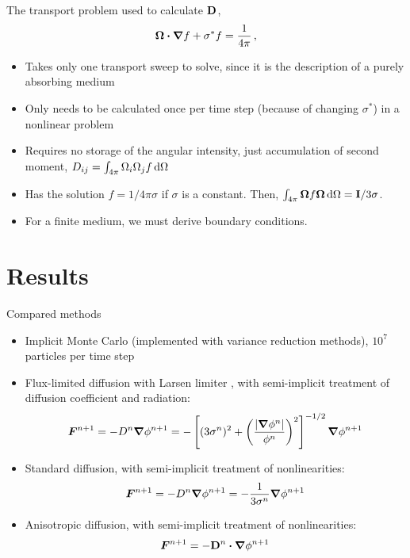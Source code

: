 \documentclass{beamer}
\begin{document}
\begin{frame}
  The transport problem used to calculate $\mathbf{D}$,
  \begin{equation*}
    \bm{\Omega}\bm{\cdot} \bm{\nabla} f + \sigma^* f = \frac{1}{4\pi} \,,
  \end{equation*}
  \vspace{-\baselineskip}
  \begin{itemize}
    \item Takes only one transport sweep to solve, since it is the description
      of a purely absorbing medium
    \item Only needs to be calculated once per time step (because of changing
      $\sigma^*$) in a nonlinear problem \item Requires no storage of the
      angular intensity, just accumulation of second moment, $D_{ij} =
      \int_{4\pi} \Omega_i \Omega_j f \mathop{}\!\mathrm{d} \Omega$
    \item Has the solution $f=1/4\pi\sigma$ if $\sigma$ is a constant.
      Then, $\int_{4\pi} \bm{\Omega} f \bm{\Omega} \mathop{}\!\mathrm{d} \Omega =
      \mathbf{I}/3\sigma$.
    \item For a finite medium, we must derive boundary conditions.
  \end{itemize}
\end{frame}

\section{Results}
\begin{frame}{Compared methods}
\begin{itemize}
  \item Implicit Monte Carlo \cite{Fle1971} (implemented with variance
    reduction methods), $10^7$ particles per time step
  \item Flux-limited diffusion with Larsen limiter \cite{Ols2000}, with
    semi-implicit treatment of diffusion coefficient and radiation:
    \begin{equation*}
      \bm{F}^{n+1} = - D^{n} \bm{\nabla} \phi^{n+1}  = -\left[ (3\sigma^{n})^2
      + \left( \frac{\left| \bm{\nabla} \phi^{n} \right|}{\phi^{n}}  \right)^2 \right]^{-1/2}
      \bm{\nabla} \phi^{n+1}
    \end{equation*}
  \item Standard diffusion, with semi-implicit treatment of nonlinearities:
    \begin{equation*}
      \bm{F}^{n+1} = - D^{n} \bm{\nabla} \phi^{n+1} 
      = -\frac{1}{3\sigma^{n}} \bm{\nabla} \phi^{n+1}
    \end{equation*}
  \item Anisotropic diffusion, with semi-implicit treatment of nonlinearities:
    \begin{equation*}
      \bm{F}^{n+1} = -\mathbf{D}^{n}\bm{\cdot} \bm{\nabla} \phi^{n+1} 
    \end{equation*}
\end{itemize}
\end{frame}
\end{document}

